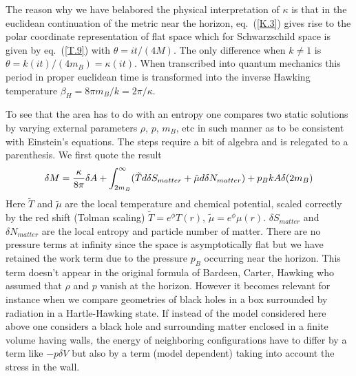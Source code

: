 \documentclass[12pt,oneside]{report}
\def\gd {\delta}
\begin{document}
The reason why we have belabored the physical
interpretation of $\kappa$ is that in the euclidean
continuation of the metric near the horizon, eq.~(\ref{K.3})
gives rise to the polar coordinate representation of flat
space which for Schwarzschild space is given by eq.~(\ref{T.9}) 
with $\theta = i t/(4M)$. The only difference when $k\neq
1$ is $\theta = k(i t ) /(4 m_B) = \kappa (it)$. When
transcribed into quantum mechanics this period in proper euclidean
 time
is transformed into the inverse Hawking temperature
$\beta_H = 8 \pi m_B / k = 2 \pi / \kappa$.

To see that the area has to do with an entropy one compares two
static solutions by varying external parameters $\rho$, $p$,
$m_B$, etc in such  manner as  to be consistent with Einstein's
equations. The steps require a bit of algebra and is
relegated to a parenthesis. We first quote the result
\begin{equation}
\gd M = {\kappa \over 8 \pi} \gd A + \int_{2 m_B}^\infty
(\tilde T d \gd S_{matter} + \tilde \mu d \gd N_{matter})
+p_B k A \gd(2 m_B)
\label{K.7}
\end{equation}
Here $\tilde T$ and $\tilde \mu$ are the local temperature
and chemical potential, scaled correctly by the red shift
(Tolman scaling) $\tilde T = e^\phi T(r)$, $\tilde \mu =
e^\phi \mu(r)$. $\gd S_{matter}$ and $\gd N_{matter}$ are
the local entropy and particle number of matter. There are
no pressure terms at infinity since  the space is
asymptotically flat but we have retained the work term due to the pressure $p_B$
occurring near the horizon. This term doesn't appear in the original formula of
Bardeen, Carter, Hawking who assumed that $\rho$ and $p$ vanish at the horizon.
However it becomes relevant for instance when we compare geometries of black
holes in a box surrounded by radiation in a Hartle-Hawking state. If
instead of the model considered here above one  considers a black hole and
surrounding matter enclosed in a finite volume having walls, the energy of
neighboring configurations have to differ by a term like $-p \delta V$ but also by
a term (model dependent) taking into account the stress in the wall.
\end{document}
